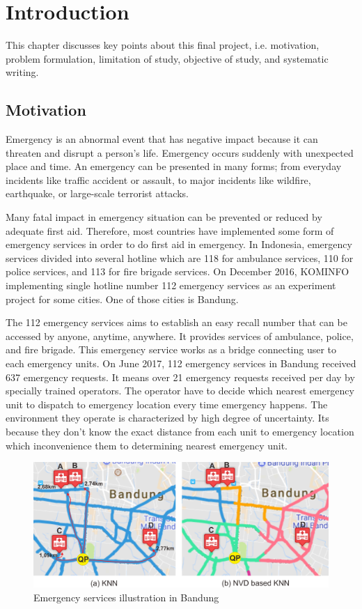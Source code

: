 \chapter{Introduction}
This chapter discusses key points about this final project, i.e. motivation, problem formulation, limitation of study, objective of study, and systematic writing.

\section{Motivation}
Emergency is an abnormal event that has negative impact because it can threaten and disrupt a person's life. Emergency occurs suddenly with unexpected place and time. An emergency can be presented in many forms; from everyday incidents like traffic accident or assault, to major incidents like wildfire, earthquake, or large-scale terrorist attacks.

Many fatal impact in emergency situation can be prevented or reduced by adequate first aid. Therefore, most countries have implemented some form of emergency services in order to do first aid in emergency. In Indonesia, emergency services divided into several hotline which are 118 for ambulance services, 110 for police services, and 113 for fire brigade services. On December 2016, KOMINFO implementing single hotline number 112 emergency services as an experiment project for some cities. One of those cities is Bandung.

The 112 emergency services  aims to establish an easy recall number that can be accessed by anyone, anytime, anywhere. It provides services of ambulance, police, and fire brigade. This emergency service works as a bridge connecting user to each emergency units. On June 2017,  112 emergency services in Bandung received 637 emergency requests. It means over 21 emergency requests received per day by specially trained operators. The operator have to decide which nearest emergency unit to dispatch to emergency location every time emergency happens. The environment they operate is characterized by high degree of uncertainty. Its because they don't know the exact distance from each unit to emergency location which inconvenience them to determining nearest emergency unit.

\pagebreak

\begin{figure}[H]
    \centering
    \includegraphics[scale=0.5]{illustration.png}
    \caption{Emergency services illustration in Bandung}
    \label{fig:illustration}
\end{figure}


